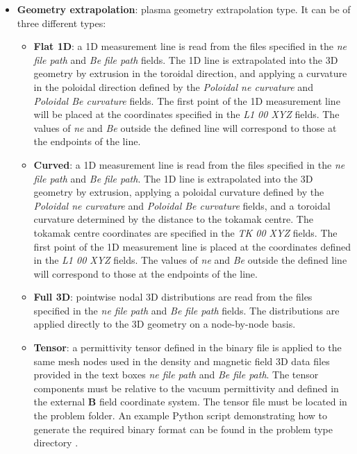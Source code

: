 \begin{itemize}\itemsep0em 
	\item \textbf{Geometry extrapolation}: plasma geometry extrapolation type. It can be of three different types: 
	\begin{itemize}\itemsep1em 
	    \item \textbf{Flat 1D}: a 1D measurement line is read from the files specified in the \textit{ne file path} and \textit{Be file path} fields. The 1D line is extrapolated into the 3D geometry by extrusion in the toroidal direction, and applying a curvature in the poloidal direction defined by the \textit{Poloidal ne curvature} and \textit{Poloidal Be curvature} fields. The first point of the 1D measurement line will be placed at the coordinates specified in the \textit{L1 00 XYZ} fields. The values of \textit{ne} and \textit{Be} outside the defined line will correspond to those at the endpoints of the line.
	    \quad
	    \item \textbf{Curved}: a 1D measurement line is read from the files specified in the \textit{ne file path} and \textit{Be file path}. The 1D line is extrapolated into the 3D geometry by extrusion, applying a poloidal curvature defined by the \textit{Poloidal ne curvature} and \textit{Poloidal Be curvature} fields, and a toroidal curvature determined by the distance to the tokamak centre. The tokamak centre coordinates are specified in the \textit{TK 00 XYZ} fields. The first point of the 1D measurement line is placed at the coordinates defined in the \textit{L1 00 XYZ} fields. The values of \textit{ne} and \textit{Be} outside the defined line will correspond to those at the endpoints of the line.	    
	    \quad
	    \item \textbf{Full 3D}: pointwise nodal 3D distributions are read from the files specified in the \textit{ne file path} and \textit{Be file path} fields. The distributions are applied directly to the 3D geometry on a node-by-node basis.
	    \quad
	    \item \textbf{Tensor}: a permittivity tensor defined in the binary file  is applied to the same mesh nodes used in the density and magnetic field 3D data files provided in the text boxes \textit{ne file path} and \textit{Be file path}. The tensor components must be relative to the vacuum permittivity and defined in the external \textbf{B} field coordinate system. The tensor file must be located in the problem folder. An example Python script demonstrating how to generate the required binary format can be found in the problem type directory .

\end{itemize}
\end{itemize}
